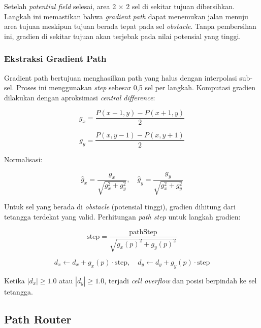 Setelah \emph{potential field} selesai, area 2 $\times$ 2 sel di
sekitar tujuan dibersihkan. Langkah ini memastikan bahwa \emph{gradient
path} dapat menemukan jalan menuju area tujuan meskipun tujuan berada
tepat pada sel \emph{obstacle}. Tanpa pembersihan ini, gradien di
sekitar tujuan akan terjebak pada nilai potensial yang tinggi.

\subsubsection{Ekstraksi Gradient Path}

Gradient path bertujuan menghasilkan path yang halus dengan interpolasi
sub-sel. Proses ini menggunakan \emph{step} sebesar 0,5 sel per
langkah. Komputasi gradien dilakukan dengan aproksimasi
\emph{central difference}:

\begin{equation}
g_x = \frac{P(x-1, y) - P(x+1, y)}{2}
\end{equation}

\begin{equation}
g_y = \frac{P(x, y-1) - P(x, y+1)}{2}
\end{equation}

Normalisasi:

\begin{equation}
\hat{g}_x = \frac{g_x}{\sqrt{g_x^2 + g_y^2}}, \quad
\hat{g}_y = \frac{g_y}{\sqrt{g_x^2 + g_y^2}}
\end{equation}

Untuk sel yang berada di \emph{obstacle} (potensial tinggi), gradien
dihitung dari tetangga terdekat yang valid. Perhitungan \emph{path step} untuk langkah gradien:

\begin{equation}
\text{step} = \frac{\text{pathStep}}{\sqrt{g_x(p)^2 + g_y(p)^2}}
\end{equation}

\begin{equation}
d_x \gets d_x + g_x(p) \cdot \text{step}, \quad
d_y \gets d_y + g_y(p) \cdot \text{step}
\end{equation}

Ketika $|d_x| \geq 1.0$ atau $|d_y| \geq 1.0$, terjadi \emph{cell
overflow} dan posisi berpindah ke sel tetangga.

\subsection{Path Router}

